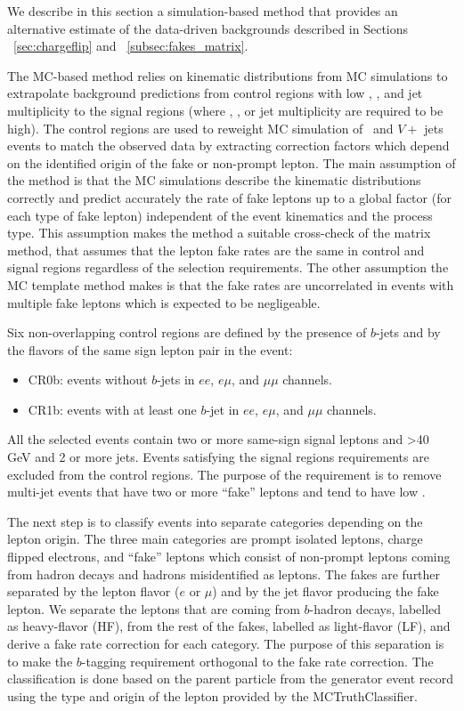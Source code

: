 We describe in this section a simulation-based method that provides an alternative estimate of the data-driven backgrounds described in Sections ~\ref{sec:chargeflip} and ~\ref{subsec:fakes_matrix}. 

The MC-based method relies on kinematic distributions from MC simulations to extrapolate background predictions from 
control regions with low \met , \meff , 
and jet multiplicity to the signal regions (where \met , \meff , or jet multiplicity are required to be high). 
The control regions are used to reweight MC simulation of \ttbar\ and $V+$ jets events to match the observed data 
by extracting correction factors which depend on the identified origin of the fake or non-prompt lepton. 
The main assumption of the method is that the MC simulations describe the kinematic distributions correctly 
and predict accurately the rate of fake leptons up to a global factor (for each type of fake lepton) 
independent of the event kinematics and the process type. This assumption makes the method a suitable cross-check of the matrix method, 
that assumes that the lepton fake rates are the same in control and signal regions regardless of the selection requirements. 
The other assumption the MC template method makes is that the fake rates are uncorrelated in events with multiple fake leptons 
which is expected to be negligeable.

Six non-overlapping control regions are defined by the presence of $b$-jets and by the flavors of the same sign lepton pair in the event:
\begin{itemize}
\item CR0b: events without $b$-jets in $ee$, $e\mu$, and $\mu\mu$ channels.
\item CR1b: events with at least one $b$-jet in $ee$, $e\mu$, and $\mu\mu$ channels.
\end{itemize}
All the selected events contain two or more same-sign signal leptons and \met >40 GeV and 2 or more jets. 
Events satisfying the signal regions requirements are excluded from the control regions. 
The purpose of the \met requirement is to remove multi-jet events that have two or more ``fake'' leptons and tend to have low \met. 

The next step is to classify events into separate categories depending on the lepton origin. 
The three main categories are prompt isolated leptons, charge flipped electrons, 
and ``fake'' leptons which consist of non-prompt leptons coming from hadron decays and hadrons misidentified as leptons. 
The fakes are further separated by the lepton flavor ($e$ or $\mu$) and by the jet flavor producing the fake lepton. 
We separate the leptons that are coming from $b$-hadron decays, 
labelled as heavy-flavor (HF), from the rest of the fakes, labelled as light-flavor (LF), and derive a fake rate correction for 
each category. The purpose of this separation is to make the $b$-tagging requirement orthogonal to the fake rate correction. 
The classification is done based on the parent particle from the generator event record using the type and origin of the lepton provided 
by the MCTruthClassifier.

